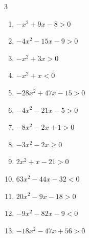 \begin{multicols}{3}
\begin{enumerate}
\resetques

  \item $-x^{2}+9x-8>0$

        \phantom{$\displaystyle 1 < x < 8$}

  \item $-4x^{2}-15x-9>0$


  \item $-x^{2}+3x>0$

        \phantom{$\displaystyle 0 < x < 3$}

  \item $-x^{2}+x<0$

        \phantom{$\displaystyle x < 0 , \; 1 < x$}

  \item $-28x^{2}+47x-15>0$


  \item $-4x^{2}-21x-5>0$


  \item $-8x^{2}-2x+1>0$


  \item $-3x^{2}-2x\geq 0$


  \item $2x^{2}+x-21>0$


  \item $63x^{2}-44x-32<0$


\columnbreak %

  \item $20x^{2}-9x-18>0$


  \item $-9x^{2}-82x-9<0$


  \item $-18x^{2}-47x+56>0$


\end{enumerate}
\end{multicols}
